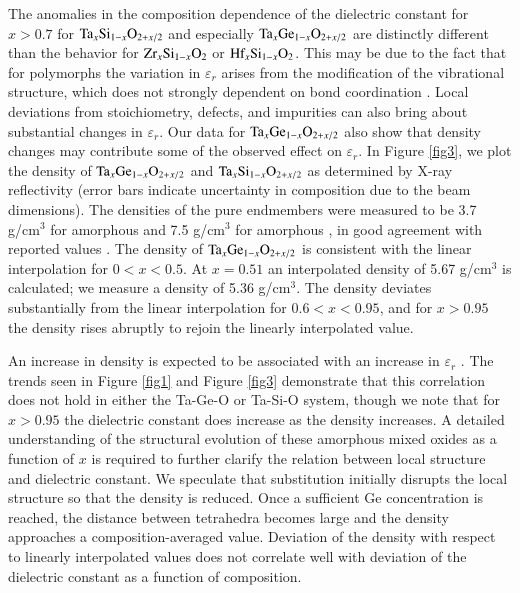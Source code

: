 The anomalies in the composition dependence of the dielectric constant for $x>0.7$ for  $\textnormal{Ta}_{x}\textnormal{Si}_{1-x}\textnormal{O}_{2+x/2}$ and especially $\textnormal{Ta}_{x}\textnormal{Ge}_{1-x}\textnormal{O}_{2+x/2}$ are distinctly different than the behavior for $\textnormal{Zr}_{x}\textnormal{Si}_{1-x}\textnormal{O}_{2}$ or $\textnormal{Hf}_{x}\textnormal{Si}_{1-x}\textnormal{O}_{2}$. This may be due to the fact that for  polymorphs the variation in $\varepsilon_r$ arises from the modification of the vibrational structure, which does not strongly dependent on bond coordination \cite{Andreoni2010}. Local deviations from stoichiometry, defects, and impurities can also bring about substantial changes in $\varepsilon_{r}$. Our data for $\textnormal{Ta}_{x}\textnormal{Ge}_{1-x}\textnormal{O}_{2+x/2}$ also show that density changes may contribute some of the observed effect on $\varepsilon_{r}$. In Figure \ref{fig3}, we plot the density of $\textnormal{Ta}_{x}\textnormal{Ge}_{1-x}\textnormal{O}_{2+x/2}$ and $\textnormal{Ta}_{x}\textnormal{Si}_{1-x}\textnormal{O}_{2+x/2}$ as determined by X-ray reflectivity (error bars indicate uncertainty in composition due to the beam dimensions). The densities of the pure endmembers were measured to be 3.7 g/cm$^{3}$ for amorphous  and 7.5 g/cm$^{3}$ for amorphous , in good agreement with reported values \cite{Weis2000, Four2000}. The density of $\textnormal{Ta}_{x}\textnormal{Ge}_{1-x}\textnormal{O}_{2+x/2}$ is consistent with the linear interpolation for $0 <x<0.5$. At $x=0.51$ an interpolated density of 5.67 g/cm$^{3}$ is calculated; we measure a density of 5.36 g/cm$^{3}$. The density deviates substantially from the linear interpolation for $0.6<x<0.95$, and for $x>0.95$ the density rises abruptly to rejoin the linearly interpolated value. 

An increase in density is expected to be associated with an increase in $\varepsilon_r$ \cite{Tomida2006, Kurtz2001}. The trends seen in Figure \ref{fig1} and Figure \ref{fig3} demonstrate that this correlation does not hold in either the Ta-Ge-O or Ta-Si-O system, though we note that for $x>0.95$ the dielectric constant does increase as the density increases. A detailed understanding of the structural evolution of these amorphous mixed oxides as a function of $x$ is required to further clarify the relation between local structure and dielectric constant. We speculate that  substitution initially disrupts the  local structure so that the density is reduced. Once a sufficient Ge concentration is reached, the distance between  tetrahedra becomes large and the density approaches a composition-averaged value. Deviation of the density with respect to linearly interpolated values does not correlate well with deviation of the dielectric constant as a function of composition.  

